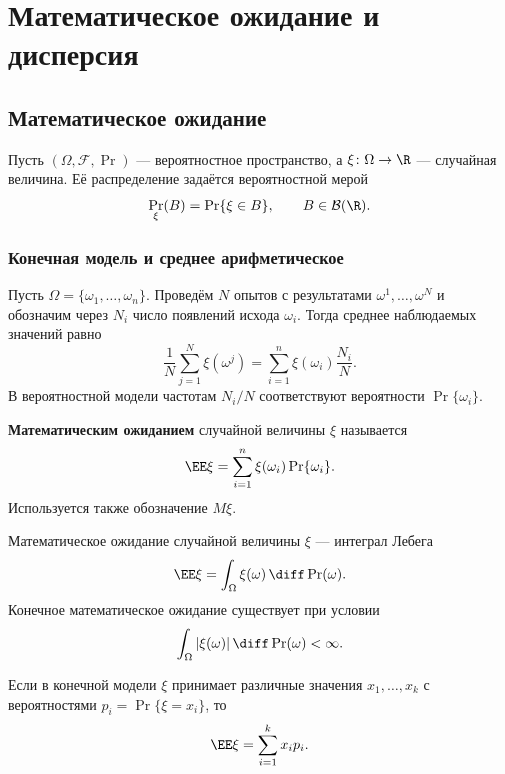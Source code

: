 \clearpage
\begingroup
{}
\section{Математическое ожидание и дисперсия}

\subsection{Математическое ожидание}

Пусть $(\Omega,\mathcal F,\Pr)$ --- вероятностное пространство,
а $\xi\colon\Omega\to\R$ --- случайная величина.
Её распределение задаётся вероятностной мерой
\[
    \Pr_\xi(B)=\Pr\{\xi\in B\},\qquad B\in\mathcal B(\R).
\]

\subsubsection{Конечная модель и среднее арифметическое}

Пусть $\Omega=\{\omega_1,\ldots,\omega_n\}$. Проведём $N$ опытов
с результатами $\omega^1,\ldots,\omega^N$ и обозначим через $N_i$
число появлений исхода $\omega_i$. Тогда среднее наблюдаемых значений равно
\[
    \frac1N\sum_{j=1}^{N}\xi(\omega^j)
    =\sum_{i=1}^{n}\xi(\omega_i)\frac{N_i}{N}.
\]
В вероятностной модели частотам $N_i/N$ соответствуют вероятности
$\Pr\{\omega_i\}$.

\begin{definition}
    \textbf{Математическим ожиданием} случайной величины $\xi$ называется
    \[
        \EE\xi=\sum_{i=1}^{n}\xi(\omega_i)\Pr\{\omega_i\}.
    \]
    Используется также обозначение $M\xi$.
\end{definition}

\begin{definition}
    Математическое ожидание случайной величины $\xi$ --- интеграл Лебега
    \[
        \EE\xi=\int_\Omega\xi(\omega)\,\diff\Pr(\omega).
    \]
    Конечное математическое ожидание существует при условии
    \[
        \int_\Omega|\xi(\omega)|\,\diff\Pr(\omega)<\infty.
    \]
\end{definition}

\begin{theorem}
    Если в конечной модели $\xi$ принимает различные значения
    $x_1,\ldots,x_k$ с вероятностями $p_i=\Pr\{\xi=x_i\}$, то
    \[
        \EE\xi=\sum_{i=1}^{k}x_i p_i.
    \]
\end{theorem}


